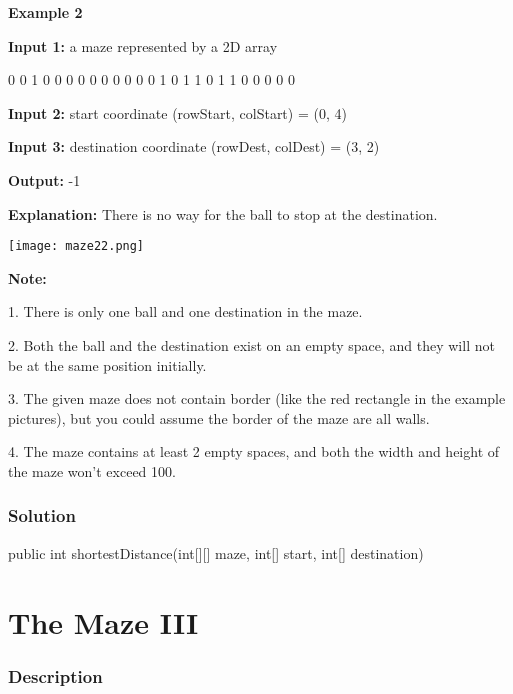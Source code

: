 \textbf{Example 2}

\textbf{Input 1:} a maze represented by a 2D array
\begin{Code}
0 0 1 0 0
0 0 0 0 0
0 0 0 1 0
1 1 0 1 1
0 0 0 0 0
\end{Code}

\textbf{Input 2:} start coordinate (rowStart, colStart) = (0, 4)

\textbf{Input 3:} destination coordinate (rowDest, colDest) = (3, 2)

\textbf{Output:} -1

\textbf{Explanation:} There is no way for the ball to stop at the destination.

\begin{center}
\texttt{[image: maze22.png]}\\
\end{center}

\textbf{Note:}

1. There is only one ball and one destination in the maze.

2. Both the ball and the destination exist on an empty space, and they will not be at the same position initially.

3. The given maze does not contain border (like the red rectangle in the example pictures), but you could assume the border of the maze are all walls.

4. The maze contains at least 2 empty spaces, and both the width and height of the maze won't exceed 100.

\subsubsection{Solution}

\begin{Code}
public int shortestDistance(int[][] maze, int[] start, int[] destination) {

}
\end{Code}

\newpage

\section{The Maze III} %

\subsubsection{Description}


